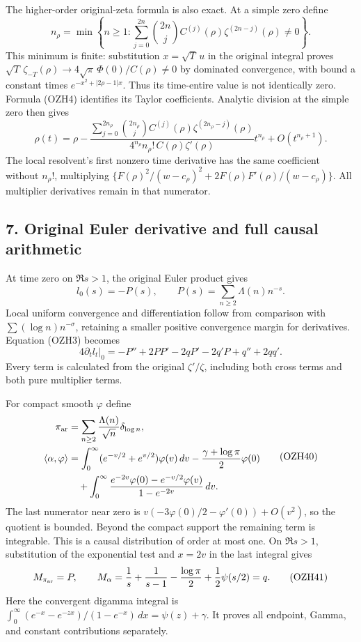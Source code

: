 \documentclass[
  10pt,
  a4paper,
]{article}
\begin{document}
The higher-order original-zeta formula is also exact. At a simple zero
define \[
n_\rho=\min\left\{n\ge1:
\sum_{j=0}^{2n}\binom{2n}{j}
C^{(j)}(\rho)\zeta^{(2n-j)}(\rho)\ne0\right\}.
\tag{OZH36}
\] This minimum is finite: substitution \(x=\sqrt T\,u\) in the original
integral proves
\(\sqrt T\,\zeta_{-T}(\rho)\to4\sqrt\pi\,\Phi(0)/C(\rho)\ne0\) by
dominated convergence, with bound a constant times
\(e^{-x^2+|2\rho-1|x}\). Thus its time-entire value is not identically
zero. Formula (OZH4) identifies its Taylor coefficients. Analytic
division at the simple zero then gives \[
\rho(t)=\rho-
\frac{\sum_{j=0}^{2n_\rho}\binom{2n_\rho}{j}
C^{(j)}(\rho)\zeta^{(2n_\rho-j)}(\rho)}
{4^{n_\rho}n_\rho!\,C(\rho)\zeta'(\rho)}
t^{n_\rho}+O(t^{n_\rho+1}).
\tag{OZH37}
\] The local resolvent's first nonzero time derivative has the same
coefficient without \(n_\rho!\), multiplying
\(\{F(\rho)^2/(w-c_\rho)^2+2F(\rho)F'(\rho)/(w-c_\rho)\}\). All
multiplier derivatives remain in that numerator.

\subsection{7. Original Euler derivative and full causal
arithmetic}\label{original-euler-derivative-and-full-causal-arithmetic}

At time zero on \(\Re s>1\), the original Euler product gives \[
l_0(s)=-P(s),\qquad P(s)=\sum_{n\ge2}\Lambda(n)n^{-s}.
\tag{OZH38}
\] Local uniform convergence and differentiation follow from comparison
with \(\sum(\log n)n^{-\sigma}\), retaining a smaller positive
convergence margin for derivatives. Equation (OZH3) becomes \[
4\partial_t l_t|_0=-P''+2PP'-2qP'-2q'P+q''+2qq'.
\tag{OZH39}
\] Every term is calculated from the original \(\zeta'/\zeta\),
including both cross terms and both pure multiplier terms.

For compact smooth \(\varphi\) define \[
\begin{aligned}
\pi_{\rm ar}&=\sum_{n\ge2}\frac{\Lambda(n)}{\sqrt n}\delta_{\log n},\\
\langle\alpha,\varphi\rangle
&=\int_0^\infty(e^{-v/2}+e^{v/2})\varphi(v)\,dv
-\frac{\gamma+\log\pi}{2}\varphi(0)\\
&\quad+\int_0^\infty
\frac{e^{-2v}\varphi(0)-e^{-v/2}\varphi(v)}
{1-e^{-2v}}\,dv .
\end{aligned}\tag{OZH40}
\] The last numerator near zero is
\(v(-3\varphi(0)/2-\varphi'(0))+O(v^2)\), so the quotient is bounded.
Beyond the compact support the remaining term is integrable. This is a
causal distribution of order at most one. On \(\Re s>1\), substitution
of the exponential test and \(x=2v\) in the last integral gives \[
M_{\pi_{\rm ar}}=P,\qquad
M_\alpha=\frac1s+\frac1{s-1}-\frac{\log\pi}{2}
+\frac12\psi(s/2)=q.
\tag{OZH41}
\] Here the convergent digamma integral is
\(\int_0^\infty(e^{-x}-e^{-zx})/(1-e^{-x})\,dx=\psi(z)+\gamma\). It
proves all endpoint, Gamma, and constant contributions separately.
\end{document}
